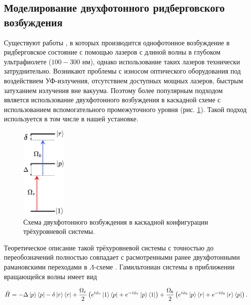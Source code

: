 
\subsection{Моделирование двухфотонного ридберговского возбуждения}

Существуют работы \cite{Srakaew:2023aa}, в которых производится однофотонное возбуждение в ридберговское состояние с помощью лазеров с длиной волны в глубоком ультрафиолете ($100-300$ нм), однако использование таких лазеров технически затруднительно. Возникают проблемы с износом оптического оборудования под воздействием УФ-излучения, отсутствием доступных мощных лазеров, быстрым затуханием излучения вне вакуума. Поэтому более популярным подходом является использование двухфотонного возбуждения в каскадной схеме с использованием вспомогательного промежуточного уровня (рис. \ref{fig:CascadeScheme}). Такой подход используется в том числе в нашей установке. 

\begin{figure}[ht]
	\centering
	\includegraphics[width=0.2\textwidth]{images/CascadeScheme.pdf}
	\caption{Схема двухфотонного возбуждения в каскадной конфигурации трёхуровневой системы.}
	\label{fig:CascadeScheme}
\end{figure}
	
Теоретическое описание такой трёхуровневой системы с точностью до переобозначений полностью совпадает с расмотренными ранее двухфотонными рамановскими переходами в $\Lambda$-схеме \cite{Steck,Lukin}. Гамильтониан системы в приближении вращающейся волны имеет вид 

\begin{equation}
	\hat{H}=-\Delta\left| p \right\rangle\left\langle p \right|-\delta\left| r \right\rangle\left\langle r \right|+\frac{\Omega_r}{2}\left(e^{i\phi_r}\left| 1 \right\rangle\left\langle p \right|+e^{-i\phi_r}\left| p \right\rangle\left\langle 1 \right|\right)+\frac{\Omega_b}{2}\left(e^{i\phi_b}\left| p \right\rangle\left\langle r \right|+e^{-i\phi_b}\left| r \right\rangle\left\langle p \right|\right).
\end{equation}

